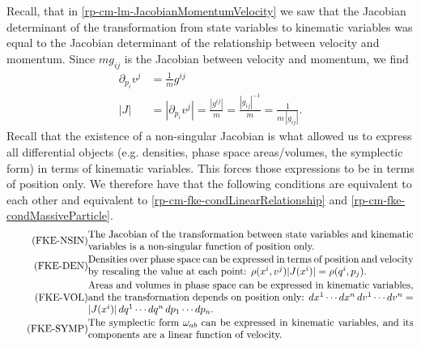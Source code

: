 Recall, that in \ref{rp-cm-lm-JacobianMomentumVelocity} we saw that the Jacobian determinant of the transformation from state variables to kinematic variables was equal to the Jacobian determinant of the relationship between velocity and momentum. Since $m g_{ij}$ is the Jacobian between velocity and momentum, we find
\begin{equation}\label{rp-cm-fke-metricTensorDeterminantIsJacobianForDensities}
	\begin{aligned}
		\partial_{p_i} v^j &= \frac{1}{m}g^{ij} \\
		|J| &= |\partial_{p_i} v^j | = \frac{|g^{ij}|}{m} = \frac{|g_{ij}|^{-1}}{m} = \frac{1}{m \,|g_{ij}|}. 
	\end{aligned}
\end{equation}
Recall that the existence of a non-singular Jacobian is what allowed us to express all differential objects (e.g. densities, phase space areas/volumes, the symplectic form) in terms of kinematic variables. This forces those expressions to be in terms of position only. We therefore have that the following conditions are equivalent to each other and equivalent to \ref{rp-cm-fke-condLinearRelationship} and \ref{rp-cm-fke-condMassiveParticle}.
\begin{align}
	\tag{FKE-NSIN}\label{rp-cm-fke-condJacobianOfPosition}
	&\eqtext{The Jacobian of the transformation between state variables and kinematic variables is a non-singular function of position only.} \\
	\tag{FKE-DEN}\label{rp-cm-fke-condDensitiesOfPosition}
	&\eqtext{Densities over phase space can be expressed in terms of position and velocity by rescaling the value at each point: $\rho(x^i, v^j) |J(x^i)| = \rho(q^i, p_j)$.} \\
	\tag{FKE-VOL}\label{rp-cm-fke-condAreasOfPosition}
	&\eqtext{Areas and volumes in phase space can be expressed in kinematic variables, and the transformation depends on position only: $dx^1 \cdots dx^n \, dv^1 \cdots dv^n = |J(x^i)| \, dq^1 \cdots dq^n \, dp_1 \cdots dp_n$.} \\
	\tag{FKE-SYMP}\label{rp-cm-fke-condSymplecticOfPosition}
	&\eqtext{The symplectic form $\omega_{ab}$ can be expressed in kinematic variables, and its components are a linear function of velocity.}
\end{align}

